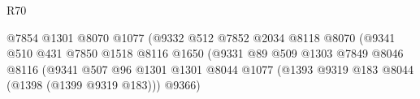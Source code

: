 \begin{lexlean}{R70}
\begin{coremodule}
                                                            @7854
                                                            @1301
                                                            @8070
                                                            @1077
                                                            (@9332
                                                              @512
                                                              @7852
                                                              @2034
                                                              @8118
                                                              @8070
                                                              (@9341
                                                                @510
                                                                @431
                                                                @7850
                                                                @1518
                                                                @8116
                                                                @1650
                                                                (@9331
                                                                  @89
                                                                  @509
                                                                  @1303
                                                                  @7849
                                                                  @8046
                                                                  @8116
                                                                  (@9341
                                                                    @507
                                                                    @96
                                                                    @1301
                                                                    @1301
                                                                    @8044
                                                                    @1077
                                                                    (@1393
                                                                      @9319
                                                                      @183
                                                                      @8044
                                                                      (@1398 (@1399 @9319 @183)))
                                                                    @9366)

\end{coremodule}
\end{lexlean}
